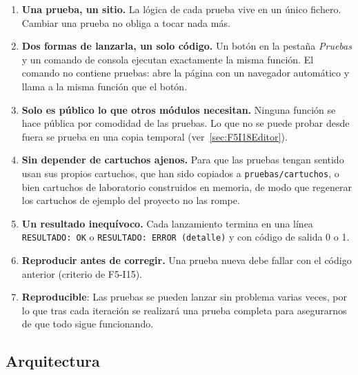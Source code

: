 \begin{enumerate}
	\item \textbf{Una prueba, un sitio.} La lógica de cada prueba vive en un único fichero. Cambiar una prueba no obliga a tocar nada más.

	\item \textbf{Dos formas de lanzarla, un solo código.} Un botón en la pestaña \emph{Pruebas} y un comando de consola ejecutan exactamente la misma función. El comando no contiene pruebas: abre la página con un navegador automático y llama a la misma función que el botón.

	\item \textbf{Solo es público lo que otros módulos necesitan.} Ninguna función se hace pública por comodidad de las pruebas. Lo que no se puede probar desde fuera se prueba en una copia temporal (ver~\ref{sec:F5I18Editor}).

	\item \textbf{Sin depender de cartuchos ajenos.} Para que las pruebas tengan sentido usan sus propios cartuchos, que han sido copiados a \texttt{pruebas/cartuchos}, o bien cartuchos de laboratorio construidos en memoria, de modo que regenerar los cartuchos de ejemplo del proyecto no las rompe.

	\item \textbf{Un resultado inequívoco.} Cada lanzamiento termina en una línea \texttt{RESULTADO: OK} o \texttt{RESULTADO: ERROR (detalle)} y con código de salida 0 o 1.

	\item \textbf{Reproducir antes de corregir.} Una prueba nueva debe fallar con el código anterior (criterio de F5-I15).
	
	\item \textbf{Reproducible}: Las pruebas se pueden lanzar sin problema varias veces, por lo que tras cada iteración se realizará una prueba completa para asegurarnos de que todo sigue funcionando.
	
\end{enumerate}

\subsection{Arquitectura}
\label{sec:F5I18Arquitectura}

